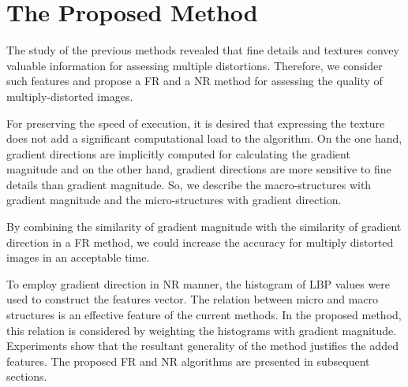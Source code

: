 \chapter{The Proposed Method}
The study of the previous methods revealed that fine details and textures convey valuable information for assessing multiple distortions. Therefore, we consider such features and propose a FR and a NR method for assessing the quality of multiply-distorted images.

For preserving the speed of execution, it is desired that expressing the texture does not add a significant computational load to the algorithm. On the one hand, gradient directions are implicitly computed for calculating the gradient magnitude and on the other hand, gradient directions are more sensitive to fine details than gradient magnitude. So, we describe the macro-structures with gradient magnitude and the micro-structures with gradient direction.

By combining the similarity of gradient magnitude with the similarity of gradient direction in a FR method, we could increase the accuracy for multiply distorted images in an acceptable time.

To employ gradient direction in NR manner, the histogram of LBP values were used to construct the features vector. The relation between micro and macro structures is an effective feature of the current methods. In the proposed method, this relation is considered by weighting the histograms with gradient magnitude. Experiments show that the resultant generality of the method justifies the added features. The proposed FR and NR algorithms are presented in subsequent sections.
